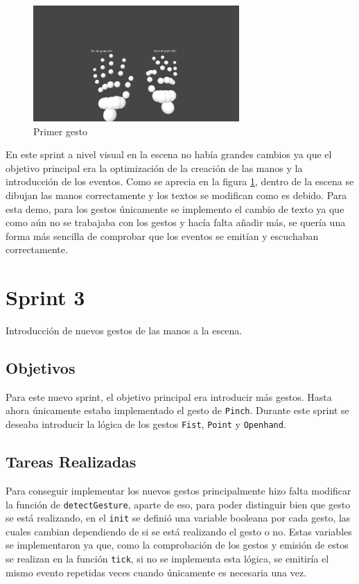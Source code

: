 \documentclass[a4paper, 12pt]{book}
\begin{document}
\begin{figure}[H] 
  \centering
  \includegraphics[width=0.7\textwidth]{img/primer_gesto.jpg}
  \caption{Primer gesto}
  \label{fig:sprint2}
\end{figure}

En este sprint a nivel visual en la escena no había grandes cambios ya que el objetivo principal era la optimización de la creación de las manos y la introducción de los eventos. 
Como se aprecia en la figura \ref{fig:sprint2}, dentro de la escena se dibujan las manos correctamente y los textos se modifican como es debido. Para esta demo, para los gestos únicamente se implemento el cambio de texto ya que 
como aún no se trabajaba con los gestos y hacía falta añadir más, se quería una forma más sencilla de comprobar que los eventos se emitían y escuchaban correctamente. 

\section{Sprint 3}
\label{sec:sprint3}
Introducción de nuevos gestos de las manos a la escena.

\subsection{Objetivos}
\label{subsec:objetivo-principal3}
Para este nuevo sprint, el objetivo principal era introducir más gestos. Hasta ahora únicamente estaba implementado el gesto de \texttt{Pinch}.
Durante este sprint se deseaba introducir la lógica de los gestos \texttt{Fist}, \texttt{Point} y \texttt{Openhand}.

\subsection{Tareas Realizadas}
\label{subsec:implementacion3}
Para conseguir implementar los nuevos gestos principalmente hizo falta modificar la función de \texttt{detectGesture}, aparte de eso, para poder distinguir bien que gesto se está realizando, en el \texttt{init} se definió una variable booleana por cada gesto, las cuales cambian dependiendo de si se está realizando el gesto o no. Estas variables se implementaron ya que, como la comprobación de los gestos y emisión de estos se realizan en la función \texttt{tick}, si no se implementa esta lógica, se emitiría el mismo evento repetidas veces cuando únicamente es necesaria una vez.
\end{document}
